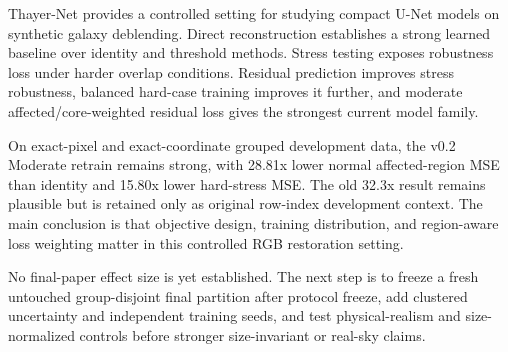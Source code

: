 Thayer-Net provides a controlled setting for studying compact U-Net models on
synthetic galaxy deblending. Direct reconstruction establishes a strong learned
baseline over identity and threshold methods. Stress testing exposes robustness
loss under harder overlap conditions. Residual prediction improves stress
robustness, balanced hard-case training improves it further, and moderate
affected/core-weighted residual loss gives the strongest current model family.

On exact-pixel and exact-coordinate grouped development data, the v0.2 Moderate
retrain remains strong, with 28.81x lower normal affected-region MSE than
identity and 15.80x lower hard-stress MSE. The old 32.3x result remains plausible
but is retained only as original row-index development context. The main
conclusion is that objective design, training distribution, and region-aware
loss weighting matter in this controlled RGB restoration setting.

No final-paper effect size is yet established. The next step is to freeze a
fresh untouched group-disjoint final partition after protocol freeze, add
clustered uncertainty and independent training seeds, and test physical-realism
and size-normalized controls before stronger size-invariant or real-sky claims.
